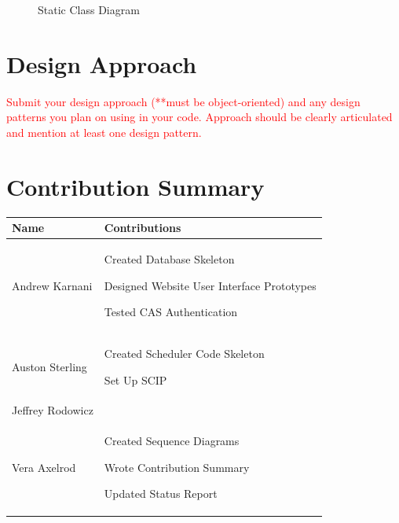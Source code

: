 \documentclass[11pt]{article}
\newenvironment{packed_itemize}{
\begin{itemize}
  \setlength{\itemsep}{1pt}
  \setlength{\parskip}{0pt}
  \setlength{\parsep}{0pt}
}{\end{itemize}}
\begin{document}
\begin{figure}
	\centering
	\caption{Static Class Diagram}
	\label{fig:staticDiagram}
\end{figure}


\section*{ Design Approach}  %
\textcolor{red}{
Submit your design approach (**must be object-oriented) and any design patterns you plan on using in your code. Approach should be clearly articulated and mention at least one design pattern.}


\section{Contribution Summary} %
\begin{tabular}{|m{1.4in}|m{4in}|}
\hline 
\textbf{\large Name}     & \textbf{\large Contributions} \\
\hline\hline

 Andrew Karnani
	&
	 \begin{packed_itemize}
		\item Created Database Skeleton
		\item Designed Website User Interface Prototypes
		\item Tested CAS Authentication
	\end{packed_itemize}
\\
\hline
 Auston Sterling
	&
	 \begin{packed_itemize}
	        \item Created Scheduler Code Skeleton
		  \item Set Up SCIP
	\end{packed_itemize}
\\
\hline
Jeffrey Rodowicz
	&
	 \begin{packed_itemize}
		\item 
	\end{packed_itemize}
\\
\hline
Vera Axelrod
	&
	 \begin{packed_itemize}
		\item Created Sequence Diagrams
		\item Wrote Contribution Summary
		\item Updated Status Report
	\end{packed_itemize}
\\
\hline
\end{tabular}
\end{document}

